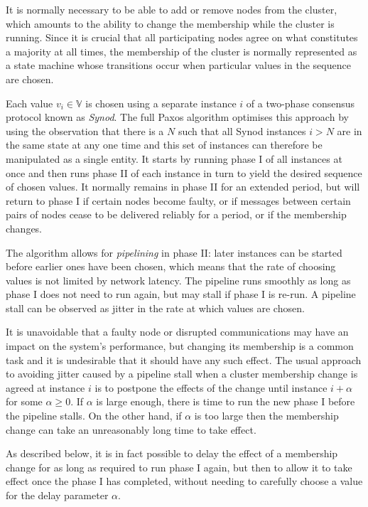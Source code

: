 \documentclass[journal]{IEEEtran}
\begin{document}
It is normally necessary to be able to add or remove nodes from the cluster,
which amounts to the ability to change the membership while the cluster is
running. Since it is crucial that all participating nodes agree on what
constitutes a majority at all times, the membership of the cluster is normally
represented as a state machine whose transitions occur when particular values
in the sequence are chosen.

Each value $v_i \in \mathbb V$ is chosen using a separate instance $i$ of a
two-phase consensus protocol known as \textit{Synod}. The full Paxos algorithm
optimises this approach by using the observation that there is a $N$ such that
all Synod instances $i > N$ are in the same state at any one time and this set
of instances can therefore be manipulated as a single entity. It starts by
running phase I of all instances at once and then runs phase II of each
instance in turn to yield the desired sequence of chosen values. It normally
remains in phase II for an extended period, but will return to phase I if
certain nodes become faulty, or if messages between certain pairs of nodes
cease to be delivered reliably for a period, or if the membership changes.

The algorithm allows for \textit{pipelining} in phase II: later instances can
be started before earlier ones have been chosen, which means that the rate of
choosing values is not limited by network latency. The pipeline runs smoothly
as long as phase I does not need to run again, but may stall if phase I is
re-run. A pipeline stall can be observed as jitter in the rate at which values
are chosen.

It is unavoidable that a faulty node or disrupted communications may have an
impact on the system's performance, but changing its membership is a common
task and it is undesirable that it should have any such effect.  The usual
approach to avoiding jitter caused by a pipeline stall when a cluster
membership change is agreed at instance $i$ is to postpone the effects of the
change until instance $i + \alpha$ for some $\alpha \ge 0$. If $\alpha$ is
large enough, there is time to run the new phase I before the pipeline stalls.
On the other hand, if $\alpha$ is too large then the membership change can take
an unreasonably long time to take effect.

As described below, it is in fact possible to delay the effect of a membership
change for as long as required to run phase I again, but then to allow it to
take effect once the phase I has completed, without needing to carefully choose
a value for the delay parameter $\alpha$.
\end{document}
